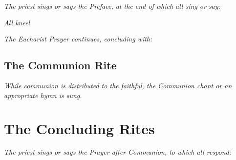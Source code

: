 \documentclass[a5paper,twoside]{article}
\begin{document}
\all\habemus

\priest\gratiasagamus

\all\dignum

\emph{The priest sings or says the Preface, at the end of which all sing or say:}

\all\sanctus

\emph{All kneel}

\priest\mysterium

\all

\mortem

\emph{The Eucharist Prayer continues, concluding with:}

\priest\doxology

\all\amen

\subsection*{The Communion Rite}

\priest\praeceptis

\all

\pater

\priest\liberanos

\all

\quiatuum

\priest\dominejesuchriste

\all\amen

\priest\paxdomini

\all\etcum

\deacon\offerte

\all\agnusdei

\priest\ecce

\all\dominenonsum

\emph{While communion is distributed to the faithful, the Communion chant or an appropriate hymn is sung.}

\section*{The Concluding Rites}

\priest\oremus

\emph{The priest sings or says the Prayer after Communion, to which all respond:}

\all\amen

\priest\greeting

\all\etcum

\priest\benedicat

\all\amen

\deacon\itemissaest

\all\deogratiasc
\end{document}
